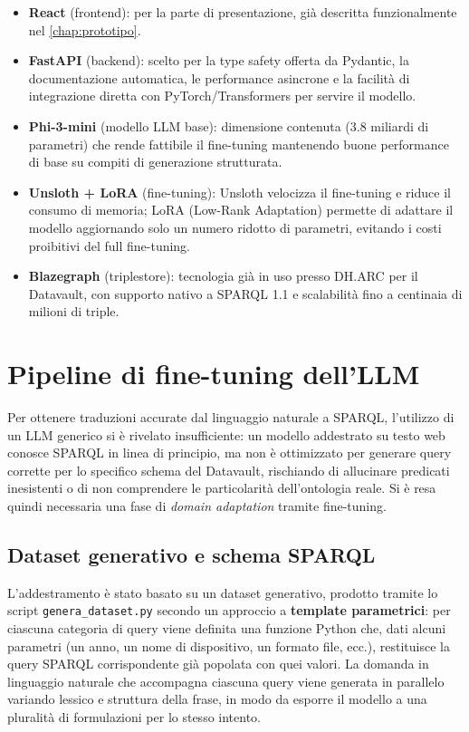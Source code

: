 \documentclass[12pt,a4paper,oneside]{book}
\newcommand{\code}[1]{\colorbox{light-gray}{\texttt{#1}}}
\begin{document}
    \begin{itemize}
      \item \textbf{React} (frontend): per la parte di presentazione, già descritta funzionalmente nel \cref{chap:prototipo}.
      \item \textbf{FastAPI} (backend): scelto per la type safety offerta da Pydantic, la documentazione automatica, le performance asincrone e la facilità di integrazione diretta con PyTorch/Transformers per servire il modello.
      \item \textbf{Phi-3-mini} (modello LLM base): dimensione contenuta (3.8 miliardi di parametri) che rende fattibile il fine-tuning mantenendo buone performance di base su compiti di generazione strutturata.
      \item \textbf{Unsloth + LoRA} (fine-tuning): Unsloth velocizza il fine-tuning e riduce il consumo di memoria; LoRA (Low-Rank Adaptation) permette di adattare il modello aggiornando solo un numero ridotto di parametri, evitando i costi proibitivi del full fine-tuning.
      \item \textbf{Blazegraph} (triplestore): tecnologia già in uso presso DH.ARC per il Datavault, con supporto nativo a SPARQL 1.1 e scalabilità fino a centinaia di milioni di triple.
    \end{itemize}



\section{Pipeline di fine-tuning dell'LLM}\label{sec:finetuning}
  Per ottenere traduzioni accurate dal linguaggio naturale a SPARQL, l'utilizzo di un LLM generico si è rivelato insufficiente: un modello addestrato su testo web conosce SPARQL in linea di principio, ma non è ottimizzato per generare query corrette per lo specifico schema del Datavault, rischiando di allucinare predicati inesistenti o di non comprendere le particolarità dell'ontologia reale. Si è resa quindi necessaria una fase di \textit{domain adaptation} tramite fine-tuning.

  \subsection{Dataset generativo e schema SPARQL}\label{subsec:dataset_gen}
    L'addestramento è stato basato su un dataset generativo, prodotto tramite lo script \code{genera\_dataset.py} secondo un approccio a \textbf{template parametrici}: per ciascuna categoria di query viene definita una funzione Python che, dati alcuni parametri (un anno, un nome di dispositivo, un formato file, ecc.), restituisce la query SPARQL corrispondente già popolata con quei valori. 
    La domanda in linguaggio naturale che accompagna ciascuna query viene generata in parallelo variando lessico e struttura della frase, in modo da esporre il modello a una pluralità di formulazioni per lo stesso intento.
\end{document}
